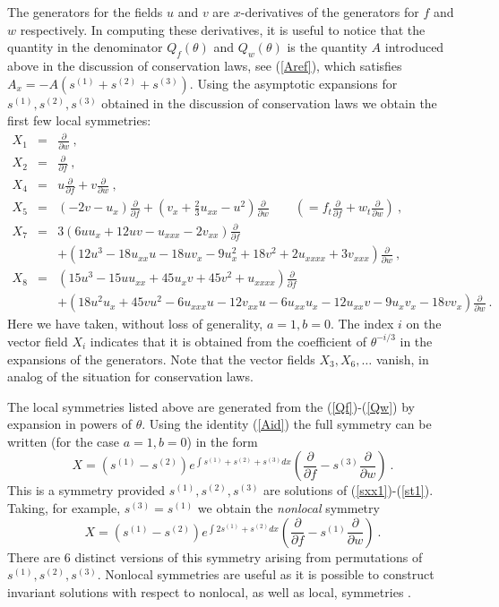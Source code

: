 \documentclass[12pt]{article}
\begin{document}
The  generators for the fields $u$ and $v$ are  $x$-derivatives of the generators for $f$ and $w$ respectively. In computing
these derivatives, it is useful to notice that the quantity in the denominator $Q_f(\theta)$ and $Q_w(\theta)$ is the quantity
$A$ introduced above in the discussion of conservation laws, see (\ref{Aref}), which satisfies  $A_x = -A(s^{(1)}+s^{(2)}+s^{(3)})$. 
Using the asymptotic expansions for $s^{(1)},s^{(2)},s^{(3)}$
obtained in the discussion of conservation laws we obtain the first few local 
symmetries: 
\begin{eqnarray*}
X_1&=&\frac{\partial}{\partial w} \ , \\
X_2&=&\frac{\partial}{\partial f} \ , \\
X_4&=&u\frac{\partial}{\partial f}+v\frac{\partial}{\partial w} \ , \\
X_5&=&(-2v-u_x)\frac{\partial}{\partial f}+\left(v_x+\frac{2}{3}u_{xx}-u^2\right)\frac{\partial}{\partial w} 
   \qquad      \left( = f_t\frac{\partial}{\partial f}+w_t\frac{\partial}{\partial w} \right)  \ , \\
X_7&=&3(6uu_x+12uv-u_{xxx}-2v_{xx})\frac{\partial}{\partial f}\\
  && +(12u^3-18u_{xx}u-18uv_x -9u_x^2+18v^2+2u_{xxxx}+3v_{xxx})\frac{\partial}{\partial w}\ , \\
X_8&=&(15u^3-15uu_{xx}+45u_xv+45v^2+u_{xxxx})\frac{\partial}{\partial f}  \\
&& +(18u^2u_x+45vu^2-6u_{xxx}u-12v_{xx}u-6u_{xx}u_x-12u_{xx}v-9u_xv_x-18vv_x)\frac{\partial}{\partial w}\ .
\end{eqnarray*}
Here we have taken, without loss of generality, $a=1,b=0$. The index $i$ on the vector field $X_i$ indicates that it
is obtained from the coefficient of $\theta^{-i/3}$ in the expansions of the generators. Note that the vector fields
$X_3,X_6,\ldots$ vanish, in analog of the situation for conservation laws. 

The local symmetries listed above are generated from the (\ref{Qf})-(\ref{Qw}) by expansion in powers
of $\theta$. Using the identity (\ref{Aid}) the full symmetry can be written (for the case $a=1,b=0$) in the form 
$$
X =  (s^{(1)}-s^{(2)})e^{\int s^{(1)}+s^{(2)}+s^{(3)}dx} \left(
\frac{\partial}{\partial f} -  s^{(3)} \frac{\partial}{\partial w} \right) \  . 
$$
This is a symmetry provided $s^{(1)},s^{(2)},s^{(3)}$ are solutions of (\ref{sxx1})-(\ref{st1}). 
Taking, for example, $s^{(3)}=s^{(1)}$ we obtain the {\em nonlocal} symmetry 
$$
X =  (s^{(1)}-s^{(2)})e^{\int 2s^{(1)}+s^{(2)} dx} \left(
\frac{\partial}{\partial f} -  s^{(1)} \frac{\partial}{\partial w} \right) \  . 
$$
There are 6 distinct versions of this symmetry arising from permutations of 
$s^{(1)},s^{(2)},s^{(3)}$. Nonlocal symmetries are useful as it is possible to construct invariant solutions
with respect to nonlocal, as well as local, symmetries \cite{Lou}. 
\end{document}
